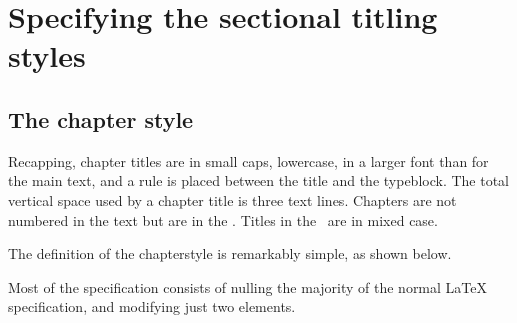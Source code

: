 \begin{figure}
\captiontitlefont{\small\sffamily}
\captionstyle{\centerlastline}
\setstocksize{11in}{8.5in}
\settrimmedsize{23cm}{13.3cm}{*}
\settypeblocksize{41\onelineskip}{21pc}{*}
\setlength{\trimtop}{0pt}
\setlength{\trimedge}{\stockwidth}
\addtolength{\trimedge}{-\paperwidth}
\setlrmargins{*}{3.1cm}{*}
\setulmargins{4.5\onelineskip}{*}{*}
\setheadfoot{\onelineskip}{3\onelineskip}
\setheaderspaces{\onelineskip}{*}{*}
\setmarginnotes{17pt}{51pt}{\onelineskip}
\checkandfixthelayout
\currentstock
\oddpagelayouttrue
\twocolumnlayoutfalse
\drawmarginparstrue
\drawparametersfalse
\drawstock
{} \label{fig:bplayout}
\end{figure}

\section{Specifying the sectional titling styles}

\subsection{The chapter style}

    Recapping, chapter titles are in small caps, lowercase, in a larger 
font than for the main text, and a rule is placed between the title and the 
typeblock.
The total vertical space used by a chapter title is three text lines.
Chapters are not numbered in the text but are in the \toc.
Titles in the \toc\ are in mixed case.

    The definition of the chapterstyle is remarkably simple, as shown below.
\begin{lcode}
\end{lcode}

    Most of the specification consists of nulling the majority of the normal
LaTeX specification, and modifying just two elements. 

